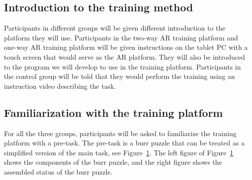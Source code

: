 \subsection{Introduction to the training method}

Participants in different groups will be given different introduction to the platform they will use.
Participants in the two-way AR training platform and one-way AR training platform will be given instructions on the tablet PC with a touch screen that would serve as the AR platform. They will also be introduced to the program we will develop to use in the training platform.
Participants in the control group will be told that they would perform the training using an instruction video describing the task.

\subsection{Familiarization with the training platform}

For all the three groups, participants will be asked to familiarize the training platform with a pre-task. The pre-task is a burr puzzle that can be treated as a simplified version of the main task, see Figure~\ref{fig:burr-puzzle}.
The left figure of Figure~\ref{fig:burr-puzzle} shows the components of the burr puzzle, and the right figure shows the assembled status of the burr puzzle.

\begin{figure}
	\centering
	\label{fig:burr-puzzle}
\end{figure}

